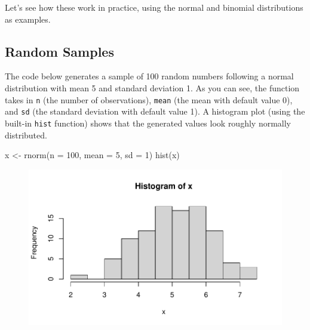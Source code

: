 \documentclass[
  letterpaper,
]{krantz}
\makeatletter
\newenvironment{Shaded}{\begin{snugshade}}{\end{snugshade}}
\newcommand{\AttributeTok}[1]{\textcolor[rgb]{0.40,0.45,0.13}{#1}}
\newcommand{\DecValTok}[1]{\textcolor[rgb]{0.68,0.00,0.00}{#1}}
\newcommand{\FunctionTok}[1]{\textcolor[rgb]{0.28,0.35,0.67}{#1}}
\newcommand{\NormalTok}[1]{\textcolor[rgb]{0.00,0.23,0.31}{#1}}
\newcommand{\OtherTok}[1]{\textcolor[rgb]{0.00,0.23,0.31}{#1}}
\newenvironment{kframe}{%
\medskip{}
\setlength{\fboxsep}{.8em}
 \def\at@end@of@kframe{}%
 \ifinner\ifhmode%
  \def\at@end@of@kframe{\end{minipage}}%
  \begin{minipage}{\columnwidth}%
 \fi\fi%
 \def\FrameCommand##1{\hskip\@totalleftmargin \hskip-\fboxsep
 \colorbox{shadecolor}{##1}\hskip-\fboxsep
     \hskip-\linewidth \hskip-\@totalleftmargin \hskip\columnwidth}%
 \MakeFramed {\advance\hsize-\width
   \@totalleftmargin\z@ \linewidth\hsize
   \@setminipage}}%
 {\par\unskip\endMakeFramed%
 \at@end@of@kframe}
\renewenvironment{Shaded}{\begin{kframe}}{\end{kframe}}
\makeatother
\begin{document}
Let's see how these work in practice, using the normal and binomial
distributions as examples.

\hypertarget{random-samples}{%
\subsection{Random Samples}\label{random-samples}}

The code below generates a sample of 100 random numbers following a
normal distribution with mean 5 and standard deviation 1. As you can
see, the function takes in \texttt{n} (the number of observations),
\texttt{mean} (the mean with default value 0), and \texttt{sd} (the
standard deviation with default value 1). A histogram plot (using the
built-in \texttt{hist} function) shows that the generated values look
roughly normally distributed.

\begin{Shaded}
\begin{Highlighting}[]
\NormalTok{x }\OtherTok{\textless{}{-}} \FunctionTok{rnorm}\NormalTok{(}\AttributeTok{n =} \DecValTok{100}\NormalTok{, }\AttributeTok{mean =} \DecValTok{5}\NormalTok{, }\AttributeTok{sd =} \DecValTok{1}\NormalTok{)}
\FunctionTok{hist}\NormalTok{(x)}
\end{Highlighting}
\end{Shaded}

\begin{figure}[H]

{\centering \includegraphics[width=1\textwidth,height=\textheight]{book/8_distributions_files/figure-pdf/unnamed-chunk-4-1.pdf}

}

\end{figure}
\end{document}
